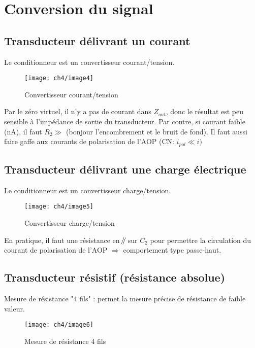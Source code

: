 \section{Conversion du signal}
\subsection{Transducteur délivrant un courant}
Le conditionneur est un convertisseur courant/tension.
\begin{figure}[H] 
	\centering 
	\texttt{[image: ch4/image4]} 
	\caption{Convertisseur courant/tension} 
\end{figure}
Par le zéro virtuel, il n'y a pas de courant dans \(Z_{out}\), donc le résultat est peu sensible à l'impédance de sortie du transducteur. Par contre, si courant faible (\si{\nano\ampere}), il faut \(R_2\gg\) (bonjour l'encombrement et le bruit de fond). Il faut aussi faire gaffe aux courants de polarisation de l'AOP (CN: \(i_{pol}\ll i)\)
\subsection{Transducteur délivrant une charge électrique}
Le conditionneur est un convertisseur charge/tension.
\begin{figure}[H] 
	\centering 
	\texttt{[image: ch4/image5]} 
	\caption{Convertisseur charge/tension} 
\end{figure}
En pratique, il faut une résistance en \(\mathbin{\!/\mkern-5mu/\!}\) sur \(C_2\) pour permettre la circulation du courant de polarisation de l'AOP \(\Rightarrow\) comportement type passe-haut.
\subsection{Transducteur résistif (résistance absolue)}
Mesure de résistance "4 fils" : permet la mesure précise de résistance de faible valeur.
\begin{figure}[H] 
	\centering 
	\texttt{[image: ch4/image6]} 
	\caption{Mesure de résistance 4 fils} 
\end{figure}
